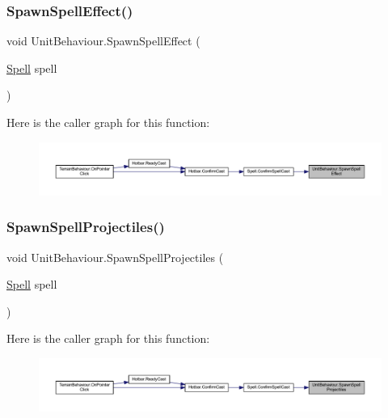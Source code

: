 \subsubsection{\texorpdfstring{SpawnSpellEffect()}{SpawnSpellEffect()}}
{\footnotesize\ttfamily void Unit\+Behaviour.\+Spawn\+Spell\+Effect (\begin{DoxyParamCaption}\item[{\mbox{\hyperlink{class_spell}{Spell}}}]{spell }\end{DoxyParamCaption})}

Here is the caller graph for this function\+:
\nopagebreak
\begin{figure}[H]
\begin{center}
\leavevmode
\includegraphics[width=350pt]{class_unit_behaviour_a558929aaa9173e1a3b9dfecd8674660f_icgraph}
\end{center}
\end{figure}
\mbox{\label{class_unit_behaviour_a2eee29cede96c8d2aa45e89eda7c0c3c}} 
\subsubsection{\texorpdfstring{SpawnSpellProjectiles()}{SpawnSpellProjectiles()}}
{\footnotesize\ttfamily void Unit\+Behaviour.\+Spawn\+Spell\+Projectiles (\begin{DoxyParamCaption}\item[{\mbox{\hyperlink{class_spell}{Spell}}}]{spell }\end{DoxyParamCaption})}

Here is the caller graph for this function\+:
\nopagebreak
\begin{figure}[H]
\begin{center}
\leavevmode
\includegraphics[width=350pt]{class_unit_behaviour_a2eee29cede96c8d2aa45e89eda7c0c3c_icgraph}
\end{center}
\end{figure}
\mbox{\label{class_unit_behaviour_a7e978454f207985987f6088c037b9c5f}} 
